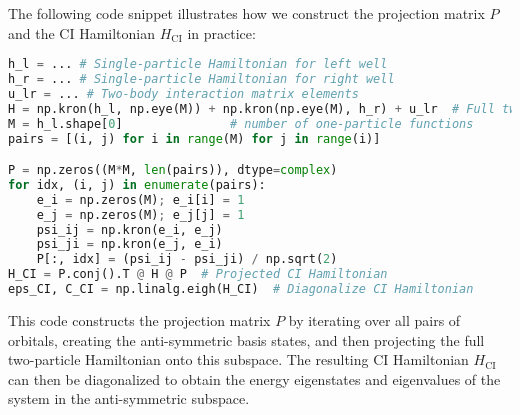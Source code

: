 \documentclass{subfiles}
\begin{document}
The following code snippet illustrates how we construct the projection matrix $P$ and the CI Hamiltonian $H_{\text{CI}}$ in practice:
\begin{lstlisting}[language=Python]
h_l = ... # Single-particle Hamiltonian for left well
h_r = ... # Single-particle Hamiltonian for right well
u_lr = ... # Two-body interaction matrix elements
H = np.kron(h_l, np.eye(M)) + np.kron(np.eye(M), h_r) + u_lr  # Full two-particle Hamiltonian in product basis
M = h_l.shape[0]               # number of one-particle functions
pairs = [(i, j) for i in range(M) for j in range(i)]

P = np.zeros((M*M, len(pairs)), dtype=complex)
for idx, (i, j) in enumerate(pairs):
    e_i = np.zeros(M); e_i[i] = 1
    e_j = np.zeros(M); e_j[j] = 1
    psi_ij = np.kron(e_i, e_j)
    psi_ji = np.kron(e_j, e_i)
    P[:, idx] = (psi_ij - psi_ji) / np.sqrt(2)
H_CI = P.conj().T @ H @ P  # Projected CI Hamiltonian
eps_CI, C_CI = np.linalg.eigh(H_CI)  # Diagonalize CI Hamiltonian
\end{lstlisting}
This code constructs the projection matrix $P$ by iterating over all pairs of orbitals, creating the anti-symmetric basis states, and then projecting the full two-particle Hamiltonian onto this subspace. The resulting CI Hamiltonian $H_{\text{CI}}$ can then be diagonalized to obtain the energy eigenstates and eigenvalues of the system in the anti-symmetric subspace.
\end{document}
